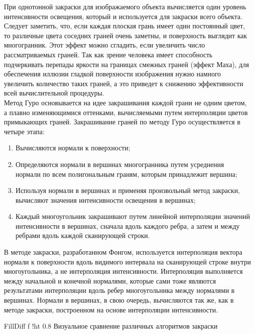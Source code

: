 При однотонной закраски для изображаемого объекта вычисляется один уровень интенсивности освещения, который и используется для закраски всего объекта. Следует заметить, что, если каждая плоская грань имеет один постоянный цвет, то различные цвета соседних граней очень заметны, и поверхность выглядит как многогранник. Этот эффект можно сгладить, если увеличить число рассматриваемых граней. Так как зрение человека имеет способность подчеркивать перепады яркости на границах смежных граней (эффект Маха), для обеспечения иллюзии гладкой поверхности изображения нужно намного увеличить количество таких граней, а это приведет к снижению эффективности всей вычислительной процедуры.\\

Метод Гуро основывается на идее закрашивания каждой грани не одним цветом, а плавно изменяющимися оттенками, вычисляемыми путем интерполяции цветов примыкающих граней. Закрашивание граней по методу Гуро осуществляется в четыре этапа:

\begin{enumerate}
	\item Вычисляются нормали к поверхности;
	\item Определяются нормали в вершинах многогранника путем усреднения нормали по всем полигональным граням, которым принадлежит вершина;
	\item Используя нормали в вершинах и применяя произвольный метод закраски, вычисляют значения интенсивности освещения в вершинах;
	\item Каждый многоугольник закрашивают путем линейной интерполяции значений интенсивности в вершинах, сначала вдоль каждого ребра, а затем и между ребрами вдоль каждой сканирующей строки.
\end{enumerate}

\leavevmode

В методе закраски, разработанном Фонгом, используется интерполяция вектора нормали к поверхности вдоль видимого интервала на сканирующей строке внутри многоугольника, а не интерполяция интенсивности. Интерполяция выполняется между начальной и конечной нормалями, которые сами тоже являются результатами интерполяции вдоль ребер многоугольника между нормалями в вершинах. Нормали в вершинах, в свою очередь, вычисляются так же, как в методе закраски, построенном на основе интерполяции интенсивности.~\cite{FILL_FACES}

{FillDiff}
{f}
{!ht}
{0.8\textwidth}
{Визуальное сравнение различных алгоритмов закраски}

